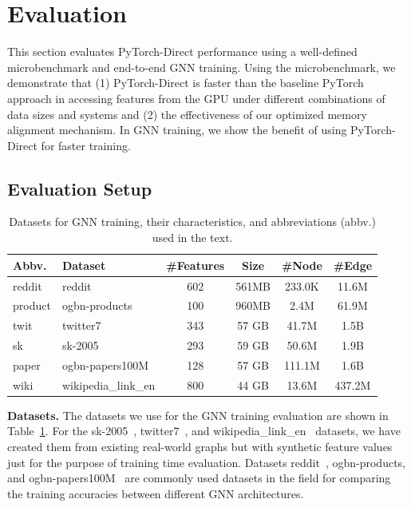 \section{Evaluation}
\label{sec:pytorch_direct_evaluation}
This section evaluates PyTorch-Direct performance using a well-defined microbenchmark and end-to-end GNN training.
Using the microbenchmark, we demonstrate that (1) PyTorch-Direct is faster than the baseline PyTorch approach in accessing features from the GPU under different combinations of data sizes and systems and (2) the effectiveness of our optimized memory alignment mechanism.
In GNN training, we show the benefit of using PyTorch-Direct for faster training.

\subsection{Evaluation Setup}
\begin{table}[]
\centering
                \begin{tabular}{llcccc}
                    \toprule
                    Abbv.   & Dataset             & \#Features & Size  & \#Node & \#Edge \\
                    \midrule
                    reddit  & reddit              & 602     & 561MB & 233.0K & 11.6M  \\
                    product & ogbn-products       & 100     & 960MB & 2.4M   & 61.9M  \\
                    twit    & twitter7            & 343     & 57 GB  & 41.7M  & 1.5B   \\
                    sk      & sk-2005             & 293     & 59 GB  & 50.6M  & 1.9B   \\
                    paper   & ogbn-papers100M     & 128     & 57 GB  & 111.1M & 1.6B   \\
                    wiki    & wikipedia\_link\_en & 800     & 44 GB  & 13.6M  & 437.2M \\
                    \bottomrule
                \end{tabular}
    \caption{Datasets for GNN training, their characteristics, and abbreviations (abbv.) used in the text.}
    \label{tab:pydarxiv_datasets}
\end{table}


\noindent\textbf{Datasets.} The datasets we use for the GNN training evaluation are shown in Table~\ref{tab:pydarxiv_datasets}.
For the sk-2005~\cite{BoVWFI}, twitter7~\cite{Kwak10www}, and wikipedia\_link\_en~\cite{konect} datasets, we have created them from existing real-world graphs but with synthetic feature values just for the purpose of training time evaluation.
Datasets reddit~\cite{hamilton2017inductive}, ogbn-products, and ogbn-papers100M~\cite{huOpenGraphBenchmark2021} are commonly used datasets in the field for comparing the training accuracies between different GNN architectures.


